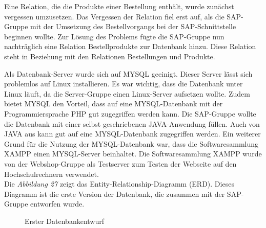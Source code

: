 Eine Relation, die die Produkte einer Bestellung enthält, wurde zunächst vergessen umzusetzen. Das Vergessen der Relation fiel erst auf, als die SAP-Gruppe mit der Umsetzung des Bestellvorgangs bei der SAP-Schnittstelle beginnen wollte. Zur Lösung des Problems fügte die SAP-Gruppe nun nachträglich eine Relation \glqq Bestellprodukte\grqq{} zur Datenbank hinzu. Diese Relation steht in Beziehung mit den Relationen \glqq Bestellungen\grqq{} und \glqq Produkte\grqq{}.

Als Datenbank-Server wurde sich auf MYSQL geeinigt. Dieser Server lässt sich problemlos auf Linux installieren. Es war wichtig, dass die Datenbank unter Linux läuft, da die Server-Gruppe einen Linux-Server aufsetzen wollte. Zudem bietet MYSQL den Vorteil, dass auf eine MYSQL-Datenbank mit der Programmiersprache PHP gut zugegriffen werden kann. Die SAP-Gruppe wollte die Datenbank mit einer selbst geschriebenen JAVA-Anwendung füllen. Auch von JAVA aus kann gut auf eine MYSQL-Datenbank zugegriffen werden. Ein weiterer Grund für die Nutzung der MYSQL-Datenbank war, dass die Softwaresammlung XAMPP einen MYSQL-Server beinhaltet. Die Softwaresammlung XAMPP wurde von der Webshop-Gruppe als Testserver zum Testen der Webseite auf den Hochschulrechnern verwendet. \\
Die \textit{Abbildung 27} zeigt das \glqq Entity-Relationship-Diagramm (ERD)\grqq{}. Dieses Diagramm ist die erste Version der Datenbank, die zusammen mit der SAP-Gruppe entworfen wurde. 

\begin{figure}[H]
	\begin{center}
	\end{center}
	\caption{Erster Datenbankentwurf}
\end{figure}

